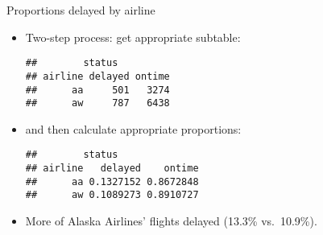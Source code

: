\begin{frame}[fragile]{Proportions delayed by airline}
  
  \begin{itemize}
  \item Two-step process: get appropriate subtable:
    
\begin{knitrout}
\color{fgcolor}\begin{kframe}
\begin{alltt}
\hlkwb{=}\hlopt{~}\hlopt{+}
\end{alltt}
\begin{verbatim}
##        status
## airline delayed ontime
##      aa     501   3274
##      aw     787   6438
\end{verbatim}
\end{kframe}
\end{knitrout}

\item and then calculate appropriate proportions:
  
\begin{knitrout}
\color{fgcolor}\begin{kframe}
\begin{alltt}
\hlstd{=}\hlstd{)}
\end{alltt}
\begin{verbatim}
##        status
## airline   delayed    ontime
##      aa 0.1327152 0.8672848
##      aw 0.1089273 0.8910727
\end{verbatim}
\end{kframe}
\end{knitrout}
\item More of Alaska Airlines' flights delayed (13.3\% vs.\ 10.9\%).
  \end{itemize}
  
\end{frame}

